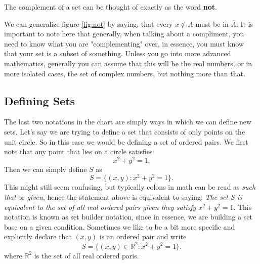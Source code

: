 \documentclass[11pt]{article}
\numberwithin{lemma}{section}
\numberwithin{equation}{section}
\numberwithin{define}{section}
\numberwithin{prop}{section}
\numberwithin{figure}{section}
\numberwithin{theorem}{section}
\newcounter{ex}[section]
\numberwithin{ex}{section}
\def\real{\mathbb{R}}
\begin{document}
The complement of a set can be thought of exactly as the word \textbf{not}.
\begin{figure}[h]
\centering
	\caption{}
	\label{fig:not}
\end{figure}
We can generalize figure \eqref{fig:not} by saying, that every $x\notin  A$ must be in $\overline A$. It is important to note here that generally, when talking about a compliment, you need to know what you are "complementing" over, in essence, you must know that your set is a subset of something. Unless you go into more advanced mathematics, generally you can assume that this will be the real numbers, or in more isolated cases, the set of complex numbers, but nothing more than that. 

\subsection{Defining Sets}
The last two notations in the chart are simply ways in which we can define new sets. Let's say we are trying to define a set that consists of only points on the unit circle. So in this case we would be defining a set of ordered pairs. We first note that any point that lies on a circle satisfies
$$x^2+y^2=1.$$
Then we can simply define $S$ as
$$S=\{(x,y) : x^2+y^2=1\}.$$
This might still seem confusing, but typically colons in math can be read as \textit{such that} or \textit{given}, hence the statement above is equivalent to saying: 
\textit{The set S is equivalent to the set of all real ordered pairs given they satisfy $x^2+y^2=1$}. 
This notation is known as set builder notation, since in essence, we are building a set base on a given condition.
Sometimes we like to be a bit more specific and explicitly declare that $(x,y)$ is an ordered pair and write
$$S=\{(x,y)\in \real^2 : x^2+y^2=1\}.$$
where $\real^2$ is the set of all real ordered paris.
\end{document}
